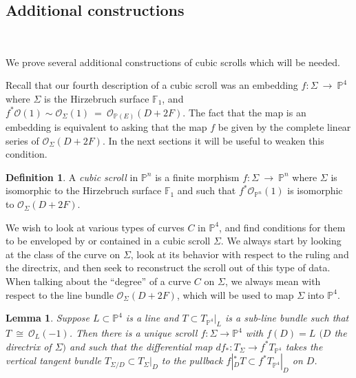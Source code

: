\documentclass[twoside,12pt,reqno]{amsart}
\theoremstyle{plain}
\newtheorem{lem}[thm]{Lemma}
\theoremstyle{definition}
\newtheorem{defn}[thm]{Definition}
\newcommand{\PP}{\mathbb{P}}
\def\ps{\vspace{4pt}}
\newcommand{\OO}{\mathcal O}
\begin{document}
\subsection{Additional constructions}~\label{subsec-addcon}

\ps

We prove several additional constructions of cubic scrolls which will
be needed.

\ps

Recall that our fourth description of a cubic scroll was an embedding
$f:\Sigma ~\rightarrow~ \PP^4$ where $\Sigma$ is the
Hirzebruch surface $\mathbb{F}_1$, and $f^*\OO(1)\sim \OO_{\Sigma}(1) ~=~
\OO_{\PP(E)}(D+2F)$.  The fact that the map is an embedding is equivalent to
asking that
the map $f$ be given by the
complete linear series of $\OO_{\Sigma}(D+2F)$.  In the next 
sections it
will be useful to weaken this condition.

\ps

\begin{defn} A \emph{cubic scroll} in $\PP^n$ is a finite morphism
$f:\Sigma~\rightarrow~ \PP^n$ where $\Sigma$ is isomorphic to the
Hirzebruch surface $\mathbb{F}_1$ and such that $f^*\OO_{\PP^n}(1)$ is
isomorphic to $\OO_{\Sigma}(D+2F)$. 
\end{defn}

\ps

We wish to look at various types of curves $C$ in $\PP^4$, and find conditions
for them to be enveloped by or contained in a cubic scroll $\Sigma$.  We always
start by looking at the class of the curve on $\Sigma$, look at its 
behavior with respect to the ruling and the directrix, and then seek to 
reconstruct the scroll out of this type of data.  When talking about the 
``degree'' of a curve $C$ on $\Sigma$, we always mean with respect to the line 
bundle $\OO_{\Sigma}(D+2F)$, which will be used to map $\Sigma$ into $\PP^4$.

\ps

\begin{lem}\label{lem-rib1}  Suppose $L\subset \PP^4$ is a line and
$T\subset T_{\PP^4}|_L$ is a sub-line bundle such that $T~\cong~
\OO_L(-1)$.  Then there is a unique scroll $f:\Sigma \rightarrow \PP^4$ with
$f(D)=L$ $(D$ the directrix of $\Sigma)$ and such that the differential map
$df_{*}: T_{\Sigma}\rightarrow f^{*}T_{\PP^4}$ takes the vertical tangent
bundle $T_{\Sigma/D} \subset T_{\Sigma}|_D$ to the pullback $f|_D^{*}T 
\subset f^{*}T_{\PP^4}|_D$ on $D$.
\end{lem}
\end{document}
